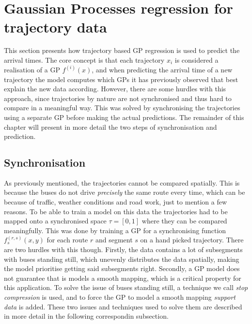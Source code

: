 \section{Gaussian Processes regression for trajectory data}
This section presents how trajectory based GP regression is used to predict the arrival times. The core concept is that each trajectory $x_i$ is considered a realisation of a GP $f^{(i)}(x)$, and when predicting the arrival time of a new trajectory the model computes which GPs it has previously observed that best explain the new data according. However, there are some hurdles with this approach, since trajectories by nature are not synchronised and thus hard to compare in a meaningful way. This was solved by synchronising the trajectories using a separate GP before making the actual predictions. The remainder of this chapter will present in more detail the two steps of synchronisation and prediction.

\subsection{Synchronisation}
As previously mentioned, the trajectories cannot be compared spatially. This is because the buses do not drive \textit{precisely} the same route every time, which can be because of traffic, weather conditions and road work, just to mention a few reasons. To be able to train a model on this data the trajectories had to be mapped onto a synchronised space $\tau = [0, 1]$ where they can be compared meaningfully. This was done by training a GP for a synchronising function $f^{(r,s)}_s(x, y)$ for each route $r$ and segment $s$ on a hand picked trajectory. There are two hurdles with this though. Firstly, the data contains a lot of subsegments with buses standing still, which unevenly distributes the data spatially, making the model prioritise getting said subsegments right. Secondly, a GP model does not guarantee that is models a smooth mapping, which is a critical property for this application. To solve the issue of buses standing still, a technique we call \textit{stop compression} is used, and to force the GP to model a smooth mapping \textit{support data} is added. These two issues and techniques used to solve them are described in more detail in the following correspondin subsection.

